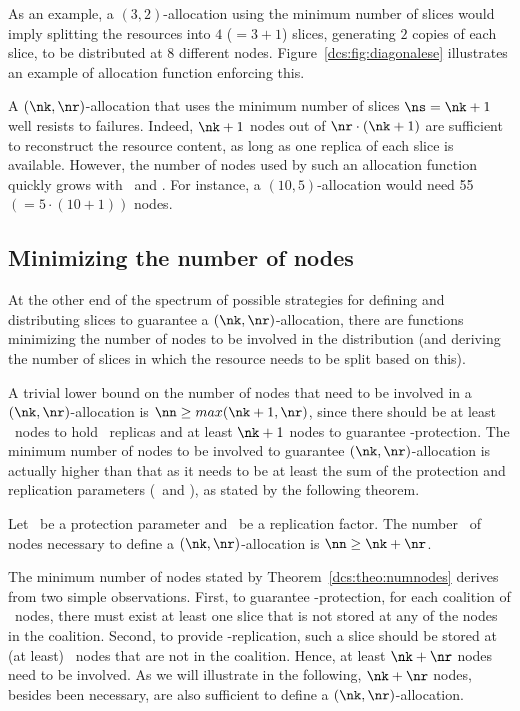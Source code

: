 As an example, a $(3,2)$-allocation using the minimum number of slices
would imply splitting the resources into $4$ ($=3+1$) slices,
generating $2$ copies of each slice, to be distributed at 8 different
nodes. Figure~\ref{dcs:fig:diagonalese} illustrates an example of
allocation function enforcing this.


A $(\nk,\nr)$-allocation that uses the minimum number of slices
$\ns=\nk+1$ well resists to failures. Indeed, $\nk+1$ nodes out of
$\nr\cdot(\nk+1)$ are sufficient to reconstruct the resource content,
as long as one replica of each slice is available. However, the number
of nodes used by such an allocation function quickly grows with
\nk\ and \nr. For instance, a $(10,5)$-allocation would need 55
$(=5\cdot(10+1))$ nodes.


\subsection{Minimizing the number of nodes}\label{dcs:ss:kompact}

At the other end of the spectrum of possible strategies for
defining and distributing slices to guarantee a $(\nk,\nr)$-allocation,
there are functions minimizing the number of nodes to be involved in the distribution
(and deriving the number of slices in which the
resource needs to be split based on this).

A trivial lower bound on the number of nodes that need to be involved
in a $(\nk,\nr)$-allocation is $\nn \geq max(\nk+1,\nr)$, since there
should be at least \nr\ nodes to hold \nr\ replicas and at least
$\nk+1$ nodes to guarantee \nk-protection.  The minimum number of
nodes to be involved to guarantee $(\nk,\nr)$-allocation is actually
higher than that as it needs to be at least the sum of the protection
and replication parameters (\nk\ and \nr), as stated by the following
theorem.

\smallskip
\begin{theorem}
Let \nk\ be a protection parameter and \nr\ be a replication
factor. The number \nn\ of nodes necessary to define a
$(\nk,\nr)$-allocation is $\nn \geq \nk+\nr$.
\end{theorem}
\smallskip

The minimum number of nodes stated by Theorem~\ref{dcs:theo:numnodes}
derives from two simple observations. First, to guarantee
\nk-protection, for each coalition of \nk\ nodes, there must exist at
least one slice that is not stored at any of the nodes in the
coalition. Second, to provide \nr-replication, such a slice should be
stored at (at least) \nr\ nodes that are not in the coalition. Hence,
at least $\nk + \nr$ nodes need to be involved. As we will illustrate
in the following, $\nk+\nr$ nodes, besides been necessary, are also
sufficient to define a $(\nk,\nr)$-allocation.

